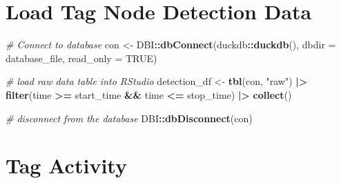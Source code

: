 \documentclass[
]{book}
\newenvironment{Shaded}{\begin{snugshade}}{\end{snugshade}}
\newcommand{\AttributeTok}[1]{\textcolor[rgb]{0.13,0.29,0.53}{#1}}
\newcommand{\CommentTok}[1]{\textcolor[rgb]{0.56,0.35,0.01}{\textit{#1}}}
\newcommand{\ConstantTok}[1]{\textcolor[rgb]{0.56,0.35,0.01}{#1}}
\newcommand{\FunctionTok}[1]{\textcolor[rgb]{0.13,0.29,0.53}{\textbf{#1}}}
\newcommand{\NormalTok}[1]{#1}
\newcommand{\OtherTok}[1]{\textcolor[rgb]{0.56,0.35,0.01}{#1}}
\newcommand{\SpecialCharTok}[1]{\textcolor[rgb]{0.81,0.36,0.00}{\textbf{#1}}}
\newcommand{\StringTok}[1]{\textcolor[rgb]{0.31,0.60,0.02}{#1}}
\begin{document}
\section{Load Tag Node Detection Data}\label{load-tag-node-detection-data}

\begin{Shaded}
\begin{Highlighting}[]
\CommentTok{\# Connect to database}
\NormalTok{con }\OtherTok{\textless{}{-}}\NormalTok{ DBI}\SpecialCharTok{::}\FunctionTok{dbConnect}\NormalTok{(duckdb}\SpecialCharTok{::}\FunctionTok{duckdb}\NormalTok{(), }
                      \AttributeTok{dbdir =}\NormalTok{ database\_file, }
                      \AttributeTok{read\_only =} \ConstantTok{TRUE}\NormalTok{)}

\CommentTok{\# load raw data table into RStudio}
\NormalTok{detection\_df }\OtherTok{\textless{}{-}} \FunctionTok{tbl}\NormalTok{(con, }\StringTok{"raw"}\NormalTok{) }\SpecialCharTok{|\textgreater{}} 
  \FunctionTok{filter}\NormalTok{(time }\SpecialCharTok{\textgreater{}=}\NormalTok{ start\_time }\SpecialCharTok{\&\&}\NormalTok{ time }\SpecialCharTok{\textless{}=}\NormalTok{ stop\_time) }\SpecialCharTok{|\textgreater{}}
  \FunctionTok{collect}\NormalTok{()}

\CommentTok{\# disconnect from the database}
\NormalTok{DBI}\SpecialCharTok{::}\FunctionTok{dbDisconnect}\NormalTok{(con)}
\end{Highlighting}
\end{Shaded}

\section{Tag Activity}\label{tag-activity}
\end{document}
